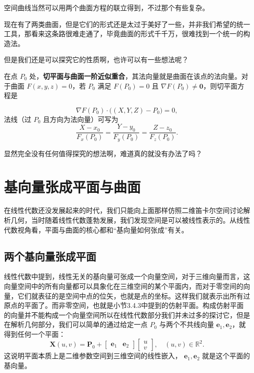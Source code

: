 \documentclass[UTF8]{ctexbook}
\newcommand{\R}{\mathbb{R}}
\begin{document}
空间曲线当然可以用两个曲面方程的联立得到，不过那个有些复杂。

现在有了两类曲面，但是它们的形式还是太过于美好了一些，并非我们希望的统一工具，那看来这条路很难走通了，毕竟曲面的形式千千万，很难找到一个统一的构造法。

但是我们还是可以探究它的性质啊，也许可以有一些想法呢？

在点 $P_0$ 处，\textbf{切平面与曲面一阶近似重合}，其法向量就是曲面在该点的法向量。对于曲面 $F(x,y,z)=0$，若 $P_0$ 满足 $F(P_0)=0$ 且 $\nabla F(P_0)\neq\mathbf{0}$，则切平面方程是

\[
\nabla F(P_0)\cdot\bigl((X,Y,Z)-P_0\bigr)=0,
\]
法线（过 $P_0$ 且方向为法向量）可写为
\[
\frac{X-x_0}{F_x(P_0)}=\frac{Y-y_0}{F_y(P_0)}=\frac{Z-z_0}{F_z(P_0)}.
\]

显然完全没有任何值得探究的想法啊，难道真的就没有办法了吗？

\newpage

\section{基向量张成平面与曲面}

在线性代数还没发展起来的时代，我们只能向上面那样仿照二维笛卡尔空间讨论解析几何，当时随着线性代数蓬勃发展，我们发现空间是可以被线性表示的。从线性代数视角看，平面与曲面的核心都和“基向量如何张成”有关。

\subsection{两个基向量张成平面}

线性代数中提到，线性无关的基向量可张成一个向量空间，对于三维向量而言，这向量空间中的所有向量都可以具象化在三维空间的某个平面内，而对于零空间的向量，它们就表征的是空间中点的位矢，也就是点的坐标。这样我们就表示出所有过原点的平面了。而非零空间，也就是小节3.4.3中提到的仿射平面。构成仿射平面的向量并不能构成一个向量空间所以在线性代数部分我们并未过多的探讨它，但是在解析几何部分，我们可以简单的通过给定一点 $P_0$ 与两个不共线向量 $\mathbf{e}_1,\mathbf{e}_2$，就得到任何一个平面：
\[
\mathbf{X}(u,v)=\mathbf{P}_0+\begin{bmatrix}\mathbf{e}_1 & \mathbf{e}_2\end{bmatrix}\begin{bmatrix}u\\v\end{bmatrix},
\quad (u,v)\in\R^2.
\]
这说明平面本质上是二维参数空间到三维空间的线性嵌入，
$\mathbf{e}_1,\mathbf{e}_2$ 就是这个平面的基向量。
\end{document}
